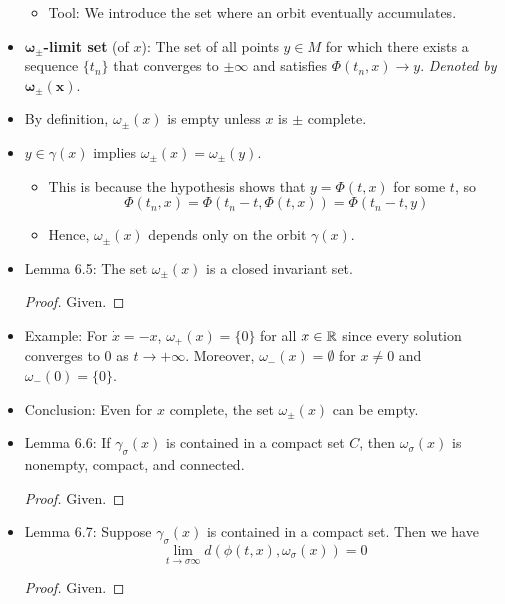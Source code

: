 \documentclass[../notes.tex]{subfiles}
\begin{document}
\begin{itemize}
    \begin{itemize}
        \item Tool: We introduce the set where an orbit eventually accumulates.
    \end{itemize}
    \item \textbf{$\bm{\omega_\pm}$-limit set} (of $x$): The set of all points $y\in M$ for which there exists a sequence $\{t_n\}$ that converges to $\pm\infty$ and satisfies $\Phi(t_n,x)\to y$. \emph{Denoted by} $\bm{\omega_\pm(x)}$.
    \item By definition, $\omega_\pm(x)$ is empty unless $x$ is $\pm$ complete.
    \item $y\in\gamma(x)$ implies $\omega_\pm(x)=\omega_\pm(y)$.
    \begin{itemize}
        \item This is because the hypothesis shows that $y=\Phi(t,x)$ for some $t$, so
        \begin{equation*}
            \Phi(t_n,x) = \Phi(t_n-t,\Phi(t,x))
            = \Phi(t_n-t,y)
        \end{equation*}
        \item Hence, $\omega_\pm(x)$ depends only on the orbit $\gamma(x)$.
    \end{itemize}
    \item Lemma 6.5: The set $\omega_\pm(x)$ is a closed invariant set.
    \begin{proof}
        Given.
    \end{proof}
    \item Example: For $\dot{x}=-x$, $\omega_+(x)=\{0\}$ for all $x\in\mathbb{R}$ since every solution converges to 0 as $t\to +\infty$. Moreover, $\omega_-(x)=\emptyset$ for $x\neq 0$ and $\omega_-(0)=\{0\}$.
    \item Conclusion: Even for $x$ complete, the set $\omega_\pm(x)$ can be empty.
    \item Lemma 6.6: If $\gamma_\sigma(x)$ is contained in a compact set $C$, then $\omega_\sigma(x)$ is nonempty, compact, and connected.
    \begin{proof}
        Given.
    \end{proof}
    \item Lemma 6.7: Suppose $\gamma_\sigma(x)$ is contained in a compact set. Then we have
    \begin{equation*}
        \lim_{t\to\sigma\infty}d(\phi(t,x),\omega_\sigma(x)) = 0
    \end{equation*}
    \begin{proof}
        Given.

\end{proof}
\end{itemize}
\end{document}
